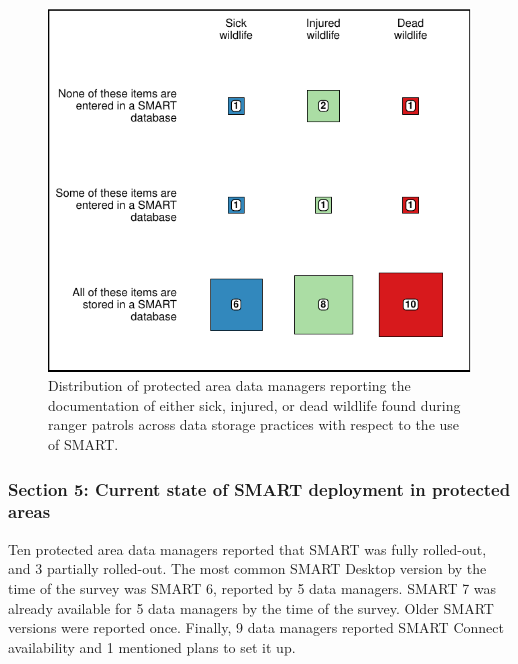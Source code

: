 \documentclass[
  letterpaper,
  DIV=11,
  numbers=noendperiod]{scrartcl}
\begin{document}
\begin{figure}[H]

{\centering \includegraphics{Appendix_final_files/figure-pdf/plot health data storage practices-1.pdf}

}

\caption{Distribution of protected area data managers reporting the
documentation of either sick, injured, or dead wildlife found during
ranger patrols across data storage practices with respect to the use of
SMART.}

\end{figure}

\hypertarget{section-5-current-state-of-smart-deployment-in-protected-areas}{%
\subsubsection{Section 5: Current state of SMART deployment in protected
areas}\label{section-5-current-state-of-smart-deployment-in-protected-areas}}

Ten protected area data managers reported that SMART was fully
rolled-out, and 3 partially rolled-out. The most common SMART Desktop
version by the time of the survey was SMART 6, reported by 5 data
managers. SMART 7 was already available for 5 data managers by the time
of the survey. Older SMART versions were reported once. Finally, 9 data
managers reported SMART Connect availability and 1 mentioned plans to
set it up.

\newpage{}
\end{document}
